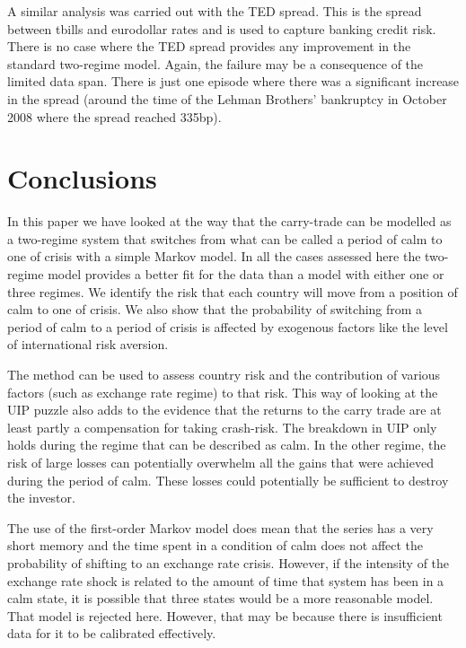 \documentclass[12pt, a4paper, oneside]{article}\usepackage[]{graphicx}\usepackage[]{color}
\begin{document}
A similar analysis was carried out with the TED spread. This is the spread between tbills and eurodollar rates and is used to capture banking credit risk.  There is no case where the TED spread provides any improvement in the standard two-regime model.  Again, the failure may be a consequence of the limited data span. There is just one episode where there was a significant increase in the spread (around the time of the Lehman Brothers' bankruptcy in October 2008 where the spread reached 335bp).

\section{Conclusions}\label{secred:con}
In this paper we have looked at the way that the carry-trade can be modelled as a two-regime system that switches from what can be called a period of calm to one of crisis with a simple Markov model.  In all the cases assessed here the two-regime model provides a better fit for the data than a model with either one or three regimes. We identify the risk that each country will move from a position of calm to one of crisis. We also show that the probability of switching from a period of calm to a period of crisis is affected by exogenous factors like the level of international risk aversion.  

The method can be used to assess country risk and the contribution of various factors (such as exchange rate regime) to that risk.  This way of looking at the UIP puzzle also adds to the evidence that the returns to the carry trade are at least partly a compensation for taking crash-risk.  The breakdown in UIP only holds during the regime that can be described as calm.  In the other regime, the risk of large losses can potentially overwhelm all the gains that were achieved during the period of calm. These losses could potentially be sufficient to destroy the investor. 

The use of the first-order Markov model does mean that the series has a very  short memory and the time spent in a condition of calm does not affect the probability of shifting to an exchange rate crisis.  However, if the intensity of the exchange rate shock is related to the amount of time that system has been in a calm state, it is possible that three states would be a more reasonable model. That model is rejected here. However, that may be because there is insufficient data for it to be calibrated effectively. 
\end{document}
